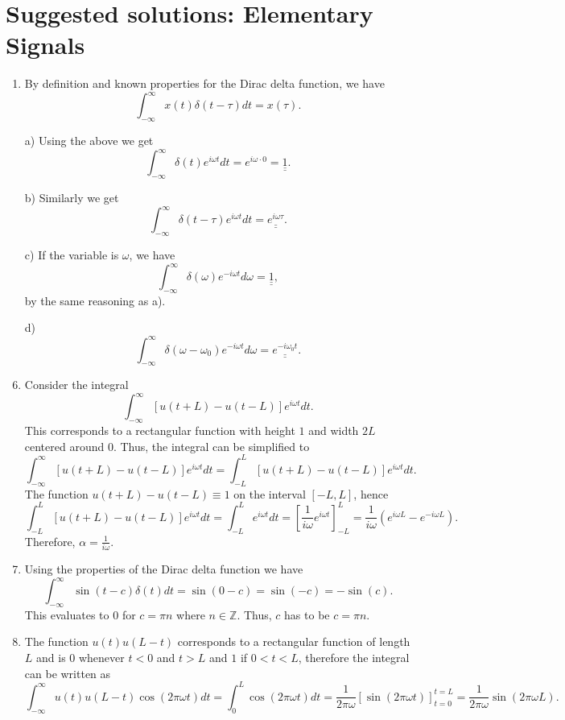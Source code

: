 \newpage
\section{Suggested solutions: Elementary Signals}

\begin{enumerate}
\item By definition and known properties for the Dirac delta function, we have
$$\int_{-\infty}^{\infty}x(t)\delta(t-\tau)dt=x(\tau).$$

\item[a)]
Using the above we get
$$\int_{-\infty}^{\infty}\delta(t)e^{i\omega t}dt=e^{i\omega\cdot 0}=\underline{\underline{1}}.$$

\item[b)]
Similarly we get
$$\int_{-\infty}^{\infty}\delta(t-\tau)e^{i\omega t}dt=\underline{\underline{e^{i\omega\tau}}}.$$

\item[c)]
If the variable is $\omega$, we have
$$\int_{-\infty}^{\infty}\delta(\omega)e^{-i\omega t}d\omega=\underline{\underline{1}},$$
by the same reasoning as a). 

\item[d)]
$$\int_{-\infty}^{\infty}\delta(\omega-\omega_{0})e^{-i\omega t}d\omega=\underline{\underline{e^{-i\omega_{0}t}}}.$$

\item Consider the integral
$$\int_{-\infty}^{\infty}[u(t+L)-u(t-L)]e^{i\omega t}dt.$$
This corresponds to a rectangular function with height $1$ and width $2L$ centered around $0$. Thus, the integral can be simplified to
$$\int_{-\infty}^{\infty}[u(t+L)-u(t-L)]e^{i\omega t}dt=\int_{-L}^{L}[u(t+L)-u(t-L)]e^{i\omega t}dt.$$
The function $u(t+L)-u(t-L)\equiv 1$ on the interval $[-L,L]$, hence
$$\int_{-L}^{L}[u(t+L)-u(t-L)]e^{i\omega t}dt=\int_{-L}^{L}e^{i\omega t}dt=\left[\frac{1}{i\omega}e^{i\omega t}\right]_{-L}^{L}=\frac{1}{i\omega}(e^{i\omega L}-e^{-i\omega L}).$$
Therefore, $\alpha=\frac{1}{i\omega}$.

\item Using the properties of the Dirac delta function we have
$$\int_{-\infty}^{\infty}\sin(t-c)\delta(t)dt=\sin(0-c)=\sin(-c)=-\sin(c).$$
This evaluates to $0$ for $c=\pi n$ where $n\in\mathbb{Z}$. Thus, $c$ has to be $c=\pi n$.

\item The function $u(t)u(L-t)$ corresponds to a rectangular function of length $L$ and is $0$ whenever $t<0$ and $t>L$ and $1$ if $0<t<L$, therefore the integral can be written as
$$\int_{-\infty}^{\infty}u(t)u(L-t)\cos(2\pi\omega t)dt=\int_{0}^{L}\cos(2\pi\omega t)dt=\frac{1}{2\pi\omega}\left[\sin(2\pi\omega t)\right]_{t=0}^{t=L}=\frac{1}{2\pi\omega}\sin(2\pi\omega L).$$


\end{enumerate}